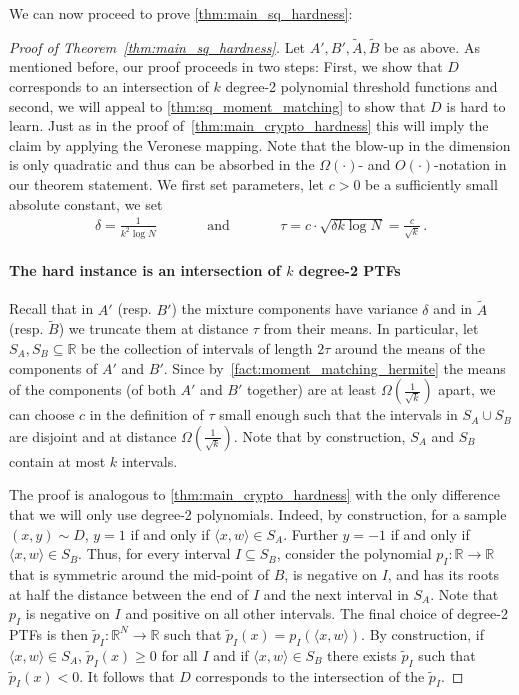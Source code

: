 \documentclass{theoretics}
\newcommand{\iprod}[1]{\langle#1\rangle}
\newcommand{\R}{\mathbb R}
\renewcommand{\geq}{\geqslant}
\newcommand{\sse}{\subseteq}
\begin{document}
We can now proceed to prove \cref{thm:main_sq_hardness}:
\begin{proof}[Proof of Theorem~\ref{thm:main_sq_hardness}]
    Let $A', B', \tilde{A},\tilde{B}$ be as above.
    As mentioned before, our proof proceeds in two steps:
    First, we show that $D$ corresponds to an intersection of $k$ degree-2 polynomial threshold functions and second, we will appeal to \cref{thm:sq_moment_matching} to show that $D$ is hard to learn.
    Just as in the proof of~\cref{thm:main_crypto_hardness} this will imply the claim by applying the Veronese mapping.
    Note that the blow-up in the dimension is only quadratic and thus can be absorbed in the $\Omega(\cdot)$- and $O(\cdot)$-notation in our theorem statement.
    We first set parameters, let $c > 0$ be a sufficiently small absolute constant, we set
    \begin{align*}
        \delta = \frac 1 {k^2 \log N} \quad\quad&&\text{and}&&\quad\quad\tau = c \cdot\sqrt{\delta k \log N} = \frac c {\sqrt{k}} \,.
    \end{align*}


    \paragraph{The hard instance is an intersection of $k$ degree-2 PTFs}
    Recall that in $A'$ (resp. $B'$) the mixture components have variance $\delta$ and in $\tilde{A}$ (resp. $\tilde{B}$) we truncate them at distance $\tau$ from their means.
    In particular, let $S_A, S_B \sse \R$ be the collection of intervals of length $2\tau$ around the means of the components of $A'$ and $B'$.
    Since by~\cref{fact:moment_matching_hermite} the means of the components (of both $A'$ and $B'$ together) are at least $\Omega(\tfrac 1 {\sqrt{k}})$ apart, we can choose $c$ in the definition of $\tau$ small enough such that the intervals in $S_A \cup S_B$ are disjoint and at distance $\Omega(\tfrac 1 {\sqrt{k}})$.
    Note that by construction, $S_A$ and $S_B$ contain at most $k$ intervals.

    The proof is analogous to \cref{thm:main_crypto_hardness} with the only difference that we will only use degree-2 polynomials.
    Indeed, by construction, for a sample $(x,y) \sim D$, $y = 1$ if and only if $\iprod{x,w} \in S_A$.
    Further $y = -1$ if and only if $\iprod{x,w} \in S_B$.
    Thus, for every interval $I \sse S_B$, consider the polynomial $p_I \colon \R \rightarrow \R$ that is symmetric around the mid-point of $B$, is negative on $I$, and has its roots at half the distance between the end of $I$ and the next interval in $S_A$.
    Note that $p_I$ is negative on $I$ and positive on all other intervals.
    The final choice of degree-2 PTFs is then $\tilde{p}_I \colon \R^N \rightarrow \R$ such that $\tilde{p}_I(x) = p_I(\iprod{x,w})$.
    By construction, if $\iprod{x,w} \in S_A$, $\tilde{p}_I(x) \geq 0$ for all $I$ and if $\iprod{x,w} \in S_B$ there exists $\tilde{p}_I$ such that $\tilde{p}_I(x) < 0$.
    It follows that $D$ corresponds to the intersection of the $\tilde{p}_I$.


\end{proof}
\end{document}

